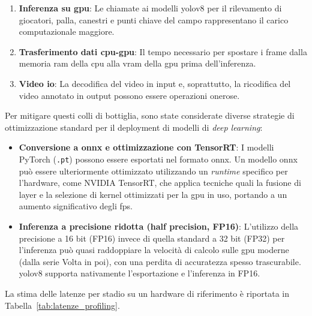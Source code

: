 \documentclass[12pt,a4paper,openright,twoside]{book}
\begin{document}
\begin{enumerate}
  \item \textbf{Inferenza su \ac{gpu}}: Le chiamate ai modelli \ac{yolo}v8 per il rilevamento di giocatori, palla, canestri 
  e punti chiave del campo rappresentano il carico computazionale maggiore.
  \item \textbf{Trasferimento dati \ac{cpu}-\ac{gpu}}: Il tempo necessario per spostare i frame dalla memoria \ac{ram} della 
  \ac{cpu} alla \ac{vram} della \ac{gpu} prima dell'inferenza.
  \item \textbf{Video \ac{io}}: La decodifica del video in input e, soprattutto, la ricodifica del video annotato in output possono essere 
  operazioni onerose.
\end{enumerate}

Per mitigare questi colli di bottiglia, sono state considerate diverse strategie di ottimizzazione standard per il deployment di modelli 
di \emph{deep learning}:

\begin{itemize}
  \item \textbf{Conversione a \ac{onnx} e ottimizzazione con TensorRT}: I modelli PyTorch (\texttt{.pt}) possono essere 
  esportati nel formato \ac{onnx}.
  Un modello \ac{onnx} può essere ulteriormente ottimizzato utilizzando un \emph{runtime} specifico per l'hardware, come NVIDIA TensorRT, 
  che applica tecniche quali la fusione di layer e la selezione di kernel ottimizzati per la \ac{gpu} in uso, portando a un aumento significativo 
  degli \ac{fps}.
  \item \textbf{Inferenza a precisione ridotta (half precision, FP16)}: L'utilizzo della precisione a 16 bit (FP16) invece di quella 
  standard a 32 bit (FP32) per l'inferenza può quasi raddoppiare la velocità di calcolo sulle \ac{gpu} moderne (dalla serie Volta in poi), 
  con una perdita di accuratezza spesso trascurabile. \ac{yolo}v8 supporta nativamente l'esportazione e l'inferenza in FP16.
\end{itemize}

La stima delle latenze per stadio su un hardware di riferimento è riportata in Tabella~\ref{tab:latenze_profiling}.

\begin{table}[h]
  \centering
  \caption{Latenze medie stimate per i principali stadi della pipeline su una \ac{gpu} NVIDIA RTX~3080. 
  I valori indicano come l'inferenza dei modelli di rilevamento domini il tempo di elaborazione.}
  \label{tab:latenze_profiling}
\end{table}
\end{document}
